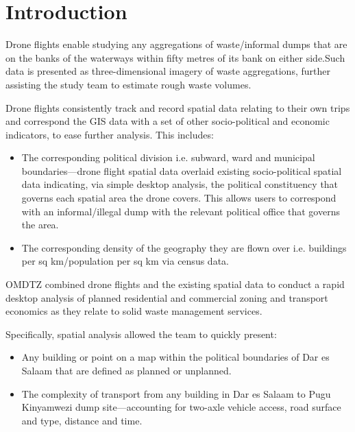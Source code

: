 \documentclass[a4paper,12pt,twoside]{article}
\begin{document}
    \begin{multicols}{2}
    \lipsum[0-3]
    \end{multicols}

\section{Introduction}

    \lipsum[0-4]
  
    Drone flights enable studying any aggregations of waste/informal dumps that are on the banks of the waterways within fifty metres of its bank on either side.Such data is presented as three-dimensional imagery of waste aggregations, further assisting the study team to estimate rough waste volumes.
    
    Drone flights consistently track and record spatial data relating to their own trips and correspond the GIS data with a set of other socio-political and economic indicators, to ease further analysis. This includes:   
    
    \begin{itemize}
        \item The corresponding political division i.e. subward, ward and municipal boundaries—drone flight spatial data overlaid existing socio-political spatial data indicating, via simple desktop analysis, the political constituency that governs each spatial area the drone covers. This allows users to correspond with an informal/illegal dump with the relevant political office that governs the area.
        \item The corresponding density of the geography they are flown over i.e. buildings per sq km/population per sq km via census data. 
    \end{itemize}
    
    
    OMDTZ  combined drone flights and the existing spatial data to conduct a rapid desktop analysis of planned residential and commercial zoning and transport economics as they relate to solid waste management services.
    
    Specifically, spatial analysis allowed the team to quickly present:
    
    \begin{itemize}
        \item Any building or point on a map within the political boundaries of Dar es Salaam that are defined as planned or unplanned.
        \item The complexity of transport from any building in Dar es Salaam to Pugu Kinyamwezi dump site---accounting for two-axle vehicle access, road surface and type, distance and time. 
    \end{itemize}
        
\end{document}
